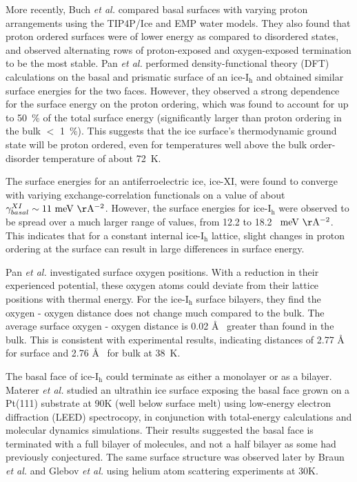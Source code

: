 More recently, Buch \textit{et al.} compared basal surfaces with
varying proton arrangements using the TIP4P/Ice and EMP water
models.\cite{Buch2008} They also found that proton ordered surfaces
were of lower energy as compared to disordered states, and observed
alternating rows of proton-exposed and oxygen-exposed termination to
be the most stable.  Pan \textit{et al.} performed density-functional
theory (DFT) calculations on the basal and prismatic surface of an
ice-I$_\mathrm{h}$ and obtained similar surface energies for the two
faces.\cite{Pan2010} However, they observed a strong dependence for
the surface energy on the proton ordering, which was found to account
for up to 50~\% of the total surface energy (significantly larger than
proton ordering in the bulk $<$ 1~\%). This suggests that the ice
surface's thermodynamic ground state will be proton ordered, even for
temperatures well above the bulk order-disorder temperature of about
72~K.

The surface energies for an antiferroelectric ice, ice-XI, were found
to converge with variying exchange-correlation functionals on a value
of about $\gamma_{basal}^{XI} \sim 11~\mathrm{meV~\AA^{-2}}$. However,
the surface energies for ice-I$_\mathrm{h}$ were observed to be spread
over a much larger range of values, from 12.2 to 18.2~
$\mathrm{meV~\AA^{-2}}$. This indicates that for a constant internal
ice-I$_\mathrm{h}$ lattice, slight changes in proton ordering at the
surface can result in large differences in surface energy.

Pan \textit{et al.} investigated surface oxygen
positions. With a reduction in their experienced potential, these
oxygen atoms could deviate from their lattice positions with thermal
energy. For the ice-I$_\mathrm{h}$ surface bilayers, they find the
oxygen - oxygen distance does not change much compared to the
bulk. The average surface oxygen - oxygen distance is 0.02 \AA~
greater than found in the bulk. This is consistent with experimental
results, indicating distances of 2.77 \AA~ for surface and 2.76 \AA~
for bulk at 38~K.\cite{Parent2002} 

The basal face of ice-I$_\mathrm{h}$ could terminate as either a
monolayer or as a bilayer. Materer \textit{et al.} studied an
ultrathin ice surface exposing the basal face grown on a Pt(111)
substrate at 90K (well below surface melt) using low-energy electron
diffraction (LEED) spectrocopy, in conjunction with total-energy
calculations and molecular dynamics
simulations.\cite{Materer1995,Materer1997} Their results suggested the
basal face is terminated with a full bilayer of molecules, and not a
half bilayer as some had previously conjectured. The same surface
structure was observed later by Braun \textit{et al.}\cite{Braun1998}
and Glebov \textit{et al.}\cite{Glebov2000} using helium atom
scattering experiments at 30K.

